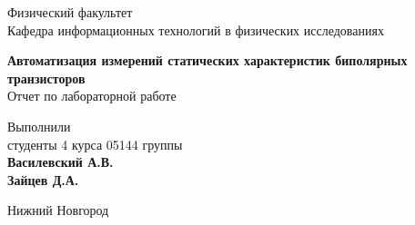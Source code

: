 

\makeatletter
\begin{titlepage}
	
	\newpage
	
    \noindent{}
    
	\vspace*{50pt}
    
	Физический факультет \\[\baselineskip]
    
	Кафедра информационных технологий в физических исследованиях

	\vspace*{100pt}

	{\Large\textbf{Автоматизация измерений статических характеристик биполярных транзисторов}} \\[\baselineskip]

	Отчет по лабораторной работе

	\vspace*{\fill}

	\hfill\begin{minipage}{15em}
    	Выполнили\\
		студенты 4 курса 05144 группы\\
		\textbf{Василевский А.В.}\\
		\textbf{Зайцев Д.А.}
    \end{minipage}
    
	
    
	\vspace*{\fill}
    
	Нижний Новгород\par
    
	
\end{titlepage}
\makeatother